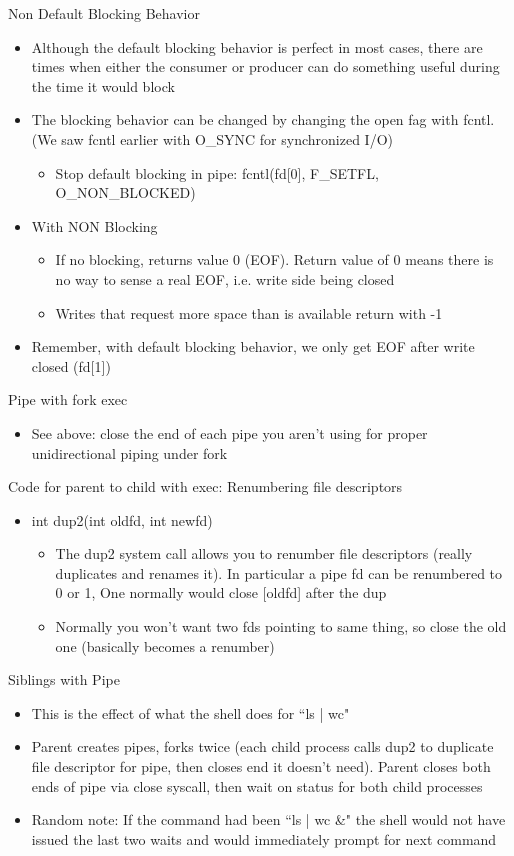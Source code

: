 Non Default Blocking Behavior
\begin{itemize}
    \item Although the default blocking behavior is perfect in most cases, there are times when either the consumer or producer can do something useful during the time it would block
    \item The blocking behavior can be changed by changing the open fag with fcntl. (We saw fcntl earlier with O\_SYNC for synchronized I/O)
    \begin{itemize}
        \item Stop default blocking in pipe: fcntl(fd[0], F\_SETFL, O\_NON\_BLOCKED)
    \end{itemize}
    \item With NON Blocking
    \begin{itemize}
        \item If no blocking, returns value 0 (EOF). Return value of 0 means there is no way to sense a real EOF, i.e. write side being closed
        \item Writes that request more space than is available return with -1
    \end{itemize}
    \item Remember, with default blocking behavior, we only get EOF after write closed (fd[1])
\end{itemize}
Pipe with fork exec
\begin{itemize}
    \item See above: close the end of each pipe you aren't using for proper unidirectional piping under fork
\end{itemize}
Code for parent to child with exec: Renumbering file descriptors
\begin{itemize}
    \item int dup2(int oldfd, int newfd)
    \begin{itemize}
        \item The dup2 system call allows you to renumber file descriptors (really duplicates and renames it). In particular a pipe fd can be renumbered to 0 or 1, One normally would close [oldfd] after the dup
        \item Normally you won't want two fds pointing to same thing, so close the old one (basically becomes a renumber)
    \end{itemize}
\end{itemize}
Siblings with Pipe
\begin{itemize}
    \item This is the effect of what the shell does for ``ls | wc"
    \item Parent creates pipes, forks twice (each child process calls dup2 to duplicate file descriptor for pipe, then closes end it doesn't need). Parent closes both ends of pipe via close syscall, then wait on status for both child processes
    \item Random note: If the command had been ``ls | wc \&" the shell would not have issued the last two waits and would immediately prompt for next command
\end{itemize}
